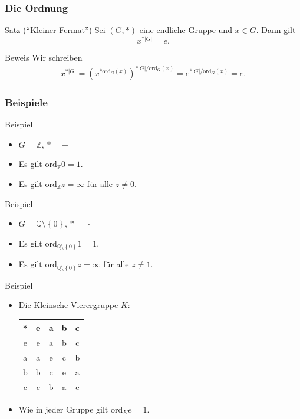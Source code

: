 \documentclass{beamer}
\newcommand\ZZ{\mathbb Z}
\newcommand\QQ{\mathbb Q}
\newcommand{\ord}{\mathrm{ord}}
\newcommand\bc[1]{\left({#1}\right)}
\newcommand\cbc[1]{\left\{{#1}\right\}}
\newcommand{\ue}{\"u}
\begin{document}
\begin{frame}\frametitle{Die Ordnung}
	\begin{block}{Satz (``Kleiner Fermat'')}
		Sei $(G,*)$ eine endliche Gruppe und $x\in G$.
		Dann gilt $$x^{*|G|}=e.$$
	\end{block}
	\begin{block}{Beweis}
	Wir schreiben	
	\begin{align*}
		x^{*|G|}=\bc{x^{*\ord_G(x)}}^{*|G|/\ord_G(x)}=e^{*|G|/\ord_G(x)}=e.
	\end{align*}
	\end{block}
\end{frame}

\begin{frame}\frametitle{Beispiele}
	\begin{overprint}
		\begin{block}{Beispiel}
			\begin{itemize}
				\item $G=\ZZ$, $*=+$
				\item Es gilt $\ord_{\ZZ}0=1$.
				\item Es gilt $\ord_{\ZZ}z=\infty$ f\ue r alle $z\neq0$.
			\end{itemize}
		\end{block}	
		\begin{block}{Beispiel}
			\begin{itemize}
				\item $G=\QQ\setminus\cbc0$, $*=\,\cdot\,$
				\item Es gilt $\ord_{\QQ\setminus\cbc0}1=1$.
				\item Es gilt $\ord_{\QQ\setminus\cbc0}z=\infty$ f\ue r alle $z\neq1$.
			\end{itemize}
		\end{block}	
		\begin{block}{Beispiel}
			\begin{itemize}
				\item Die Kleinsche Vierergruppe $K$:
					\begin{center}
						\begin{tabular}{c|cccc}
							*&e&a&b&c\\\hline
							e&e&a&b&c\\
							a&a&e&c&b\\
							b&b&c&e&a\\
							c&c&b&a&e
						\end{tabular}
					\end{center}
				\item Wie in jeder Gruppe gilt $\ord_Ke=1$.

\end{itemize}
\end{block}
\end{overprint}
\end{frame}
\end{document}
